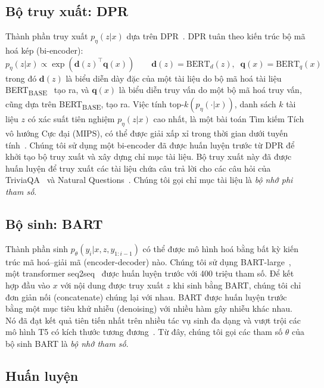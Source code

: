 \documentclass[10pt,letterpaper]{article}
\begin{document}
\subsection{Bộ truy xuất: DPR}

Thành phần truy xuất $p_\eta(z|x)$ dựa trên DPR~\cite{b26}. DPR tuân theo kiến
trúc bộ mã hoá kép (bi-encoder):
\[
  p_\eta(z|x) \propto \exp\!\left(\mathbf{d}(z)^{\top}\mathbf{q}(x)\right)
  \qquad
  \mathbf{d}(z) = \text{BERT}_d(z),\;\; \mathbf{q}(x) = \text{BERT}_q(x)
\]
trong đó $\mathbf{d}(z)$ là biểu diễn dày đặc của một tài liệu do bộ mã hoá tài
liệu BERT\textsubscript{BASE}~\cite{b8} tạo ra, và $\mathbf{q}(x)$ là biểu diễn
truy vấn do một bộ mã hoá truy vấn, cũng dựa trên BERT\textsubscript{BASE}, tạo
ra. Việc tính $\text{top-}k(p_\eta(\cdot|x))$, danh sách $k$ tài liệu $z$ có
xác suất tiên nghiệm $p_\eta(z|x)$ cao nhất, là một bài toán Tìm kiếm Tích vô
hướng Cực đại (MIPS), có thể được giải xấp xỉ trong thời gian dưới tuyến
tính~\cite{b23}. Chúng tôi sử dụng một bi-encoder đã được huấn luyện trước từ
DPR để khởi tạo bộ truy xuất và xây dựng chỉ mục tài liệu. Bộ truy xuất này đã
được huấn luyện để truy xuất các tài liệu chứa câu trả lời cho các câu hỏi của
TriviaQA~\cite{b24} và Natural Questions~\cite{b29}. Chúng tôi gọi chỉ mục tài
liệu là \emph{bộ nhớ phi tham số}.

\subsection{Bộ sinh: BART}

Thành phần sinh $p_\theta(y_i|x,z,y_{1:i-1})$ có thể được mô hình hoá bằng bất
kỳ kiến trúc mã hoá--giải mã (encoder-decoder) nào. Chúng tôi sử dụng
BART-large~\cite{b32}, một transformer seq2seq~\cite{b58} được huấn luyện trước
với 400 triệu tham số. Để kết hợp đầu vào $x$ với nội dung được truy xuất $z$
khi sinh bằng BART, chúng tôi chỉ đơn giản nối (concatenate) chúng lại với
nhau. BART được huấn luyện trước bằng một mục tiêu khử nhiễu (denoising) với
nhiều hàm gây nhiễu khác nhau. Nó đã đạt kết quả tiên tiến nhất trên nhiều tác
vụ sinh đa dạng và vượt trội các mô hình T5 có kích thước tương
đương~\cite{b32}. Từ đây, chúng tôi gọi các tham số $\theta$ của bộ sinh BART
là \emph{bộ nhớ tham số}.

\subsection{Huấn luyện}
\end{document}
